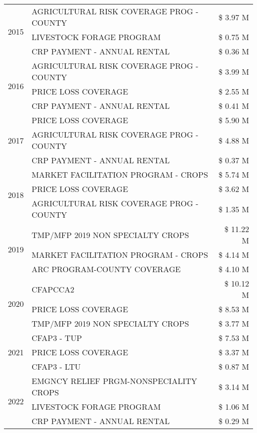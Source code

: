 \begin{tabular}{llr}
\cline{1-3}
\multirow[t]{3}{*}{2015} & AGRICULTURAL RISK COVERAGE PROG - COUNTY & \$ 3.97 M \\
 & LIVESTOCK FORAGE PROGRAM & \$ 0.75 M \\
 & CRP PAYMENT - ANNUAL RENTAL & \$ 0.36 M \\
\cline{1-3}
\multirow[t]{3}{*}{2016} & AGRICULTURAL RISK COVERAGE PROG - COUNTY & \$ 3.99 M \\
 & PRICE LOSS COVERAGE & \$ 2.55 M \\
 & CRP PAYMENT - ANNUAL RENTAL & \$ 0.41 M \\
\cline{1-3}
\multirow[t]{3}{*}{2017} & PRICE LOSS COVERAGE & \$ 5.90 M \\
 & AGRICULTURAL RISK COVERAGE PROG - COUNTY & \$ 4.88 M \\
 & CRP PAYMENT - ANNUAL RENTAL & \$ 0.37 M \\
\cline{1-3}
\multirow[t]{3}{*}{2018} & MARKET FACILITATION PROGRAM - CROPS & \$ 5.74 M \\
 & PRICE LOSS COVERAGE & \$ 3.62 M \\
 & AGRICULTURAL RISK COVERAGE PROG - COUNTY & \$ 1.35 M \\
\cline{1-3}
\multirow[t]{3}{*}{2019} & TMP/MFP 2019 NON SPECIALTY CROPS & \$ 11.22 M \\
 & MARKET FACILITATION PROGRAM - CROPS & \$ 4.14 M \\
 & ARC PROGRAM-COUNTY COVERAGE & \$ 4.10 M \\
\cline{1-3}
\multirow[t]{3}{*}{2020} & CFAPCCA2 & \$ 10.12 M \\
 & PRICE LOSS COVERAGE & \$ 8.53 M \\
 & TMP/MFP 2019 NON SPECIALTY CROPS & \$ 3.77 M \\
\cline{1-3}
\multirow[t]{3}{*}{2021} & CFAP3 - TUP & \$ 7.53 M \\
 & PRICE LOSS COVERAGE & \$ 3.37 M \\
 & CFAP3 - LTU & \$ 0.87 M \\
\cline{1-3}
\multirow[t]{3}{*}{2022} & EMGNCY RELIEF PRGM-NONSPECIALITY CROPS & \$ 3.14 M \\
 & LIVESTOCK FORAGE PROGRAM & \$ 1.06 M \\
 & CRP PAYMENT - ANNUAL RENTAL & \$ 0.29 M \\
\cline{1-3}
\bottomrule
\end{tabular}
